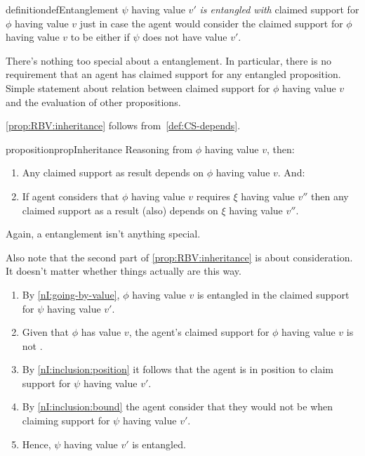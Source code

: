 \begin{note}
  \begin{restatable}[Entanglement]{definition}{defEntanglement}\label{def:CS-depends}
    \(\psi\) having value \(v'\) \emph{is entangled with} claimed support for \(\phi\) having value \(v\) just in case the agent would consider the claimed support for \(\phi\) having value \(v\) to be either \mom{} if \(\psi\) does not have value \(v'\).
  \end{restatable}

  There's nothing too special about a entanglement.
  In particular, there is no requirement that an agent has claimed support for any entangled proposition.
  Simple statement about relation between claimed support for \(\phi\) having value \(v\) and the evaluation of other propositions.

  \autoref{prop:RBV:inheritance} follows from~\autoref{def:CS-depends}.

  \begin{restatable}[]{proposition}{propInheritance}\label{prop:RBV:inheritance}
    Reasoning from \(\phi\) having value \(v\), then:
    \begin{enumerate}
    \item Any claimed support as result depends on \(\phi\) having value \(v\). And:
    \item If agent considers that \(\phi\) having value \(v\) requires \(\xi\) having value \(v''\) then any claimed support as a result (also) depends on \(\xi\) having value \(v''\).
    \end{enumerate}
  \end{restatable}

  Again, a entanglement isn't anything special.

  {
    \color{red}
    Also note that the second part of \ref{prop:RBV:inheritance} is about consideration.
    It doesn't matter whether things actually are this way.
  }
\end{note}

\begin{note}
  \begin{enumerate}
  \item By \ref{nI:going-by-value}, \(\phi\) having value \(v\) is entangled in the claimed support for \(\psi\) having value \(v'\).
  \item Given that \(\phi\) has value \(v\), the agent's claimed support for \(\phi\) having value \(v\) is not \misled{}.
  \item By \ref{nI:inclusion:position} it follows that the agent is in position to claim support for \(\psi\) having value \(v'\).
  \item By \ref{nI:inclusion:bound} the agent consider that they would not be \mistaken{} when claiming support for \(\psi\) having value \(v'\).
  \item Hence, \(\psi\) having value \(v'\) is entangled.
  \end{enumerate}
\end{note}

